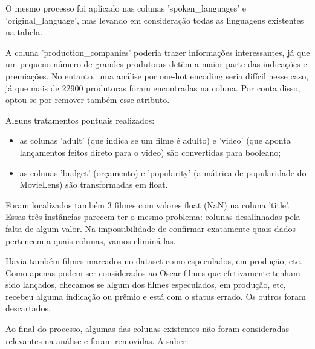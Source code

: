             O mesmo processo foi aplicado nas colunas 'spoken\_languages' e 'original\_language', mas levando em consideração todas as linguagens existentes na tabela.

            A coluna 'production\_companies' poderia trazer informações interessantes, já que um pequeno número de grandes produtoras detêm a maior parte das indicações e premiações\cite{argon2020}. No entanto, uma análise por one-hot encoding seria difícil nesse caso, já que mais de 22900 produtoras foram encontradas na coluna. Por conta disso, optou-se por remover também esse atributo.\newline

            Alguns tratamentos pontuais realizados:
            \begin{itemize}
                \item as colunas 'adult' (que indica se um filme é adulto) e 'video' (que aponta lançamentos feitos direto para o video) são convertidas para booleano;
                \item as colunas 'budget' (orçamento) e 'popularity' (a mátrica de popularidade do MovieLens) são transformadas em float.\newline
            \end{itemize}
            
            Foram localizados também 3 filmes com valores float (NaN) na coluna 'title'. Essas três instâncias parecem ter o mesmo problema: colunas desalinhadas pela falta de algum valor. Na impossibilidade de confirmar exatamente quais dados pertencem a quais colunas, vamos eliminá-las.
            
            Havia também filmes marcados no dataset como especulados, em produção, etc. Como apenas podem ser considerados ao Oscar filmes que efetivamente tenham sido lançados, checamos se algum dos filmes especulados, em produção, etc, recebeu alguma indicação ou prêmio e está com o status errado. Os outros foram descartados.
            
            Ao final do processo, algumas das colunas existentes não foram consideradas relevantes na análise e foram removidas. A saber:

